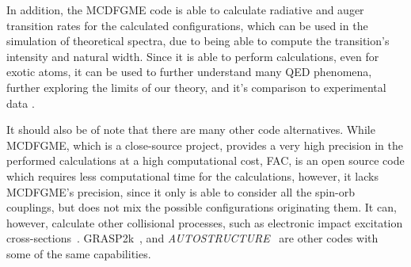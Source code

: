 In addition, the \gls{MCDFGME} code is able to calculate radiative and auger transition rates for the calculated configurations, which can be used in the simulation of theoretical spectra, due to being able to compute the transition's intensity and natural width.
Since it is able to perform calculations, even for exotic atoms, it can be used to further understand many QED phenomena, further exploring the limits of our theory, and it's comparison to experimental data \cite{Paul2021}.

It should also be of note that there are many other code alternatives. While \gls{MCDFGME}, which is a close-source project, provides a very high precision in the performed calculations at a high computational cost, \gls{FAC}, is an open source code which requires less computational time for the calculations, however, it lacks \gls{MCDFGME}'s precision, since it only is able to consider all the spin-orb couplings, but does not mix the possible configurations originating them. 
It can, however, calculate other collisional processes, such as electronic impact excitation cross-sections~\cite{FAC}. \gls{GRASP2k}~\cite{GRASP2K}, and \textit{AUTOSTRUCTURE}~\cite{AUTOSTRUCTURE} are other codes with some of the same capabilities.


